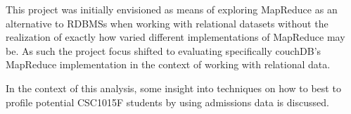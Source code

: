 This project was initially envisioned as means of exploring MapReduce as an alternative to RDBMSs when working with relational datasets without the realization of exactly how varied different implementations of MapReduce may be. As such the project focus shifted to evaluating specifically couchDB's MapReduce implementation in the context of working with relational data.

In the context of this analysis, some insight into techniques on how to best to profile potential CSC1015F students by using admissions data is discussed.
